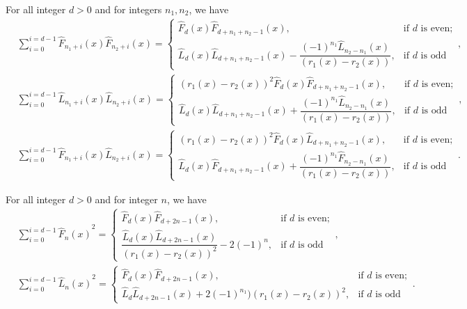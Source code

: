 \begin{theorem}
For all integer $d > 0$ and for integers $n_1, n_2$, we have
\begin{align*}
&\sum_{i=0}^{i=d-1}\widehat{F}_{n_1+i}(x) \widehat{F}_{n_2+i}(x)      =
 \begin{cases}
  \widehat{F}_{d}(x) \widehat{F}_{d+n_1+n_2-1}(x), & \text {if $d$ is even};\\
 \widehat{L}_{d}(x)\widehat{L}_{d+n_1+n_2-1}(x)-\dfrac{(-1)^{n_1}\widehat{L}_{n_2-n_1}(x)}{(r_1(x) - r_2(x))}, & \text{if $d$ is odd}
 \end{cases}, \\
&\sum_{i=0}^{i=d-1}\widehat{L}_{n_1+i}(x)\widehat{L}_{n_2+i}(x) =
 \begin{cases}
(r_1(x) - r_2(x))^2  \widehat{F}_{d}(x) \widehat{F}_{d+n_1+n_2-1}(x), & \text {if $d$ is even};\\
 \widehat{L}_{d}(x)\widehat{L}_{d+n_1+n_2-1}(x)+\dfrac{(-1)^{n_1}\widehat{L}_{n_2-n_1}(x)}{(r_1(x) - r_2(x))}, & \text{if $d$ is odd}
 \end{cases},\\
 &\sum_{i=0}^{i=d-1} \widehat{F}_{n_1+i}(x) \widehat{L}_{n_2+i}(x) =
 \begin{cases}
 (r_1(x) - r_2(x))^2  \widehat{F}_{d}(x) \widehat{L}_{d+n_1+n_2-1}(x), & \text {if $d$ is even};\\
  \widehat{L}_{d}(x)\widehat{F}_{d+n_1+n_2-1}(x)+\dfrac{(-1)^{n_1}\widehat{F}_{n_2-n_1}(x)}{(r_1(x) - r_2(x))}, & \text{if $d$ is odd}
 \end{cases}.
 \end{align*}
\end{theorem}
\begin{corollary} For all integer $d > 0$ and for integer $n$, we have
\begin{align*}
&\sum_{i=0}^{i=d-1}{\widehat{F}_{n}(x)}^2 = 
 \begin{cases}
 \widehat{F}_{d}(x)\widehat{F}_{d+2n-1}(x), & \text {if $d$ is even};\\
 \dfrac{\widehat{L}_{d}(x)\widehat{L}_{d+2n-1}(x)}{(r_1(x) - r_2(x))^2}-2(-1)^{n}, & \text{if $d$ is odd}
 \end{cases},\\
&\sum_{i=0}^{i=d-1}{\widehat{L}_{n}(x)}^2 = 
 \begin{cases}
 \widehat{F}_{d}(x)\widehat{F}_{d+2n-1}(x), & \text {if $d$ is even};\\
 \widehat{L}_{d}\widehat{L}_{d+2n-1}(x)+2(-1)^{n_1})(r_1(x) - r_2(x))^2, & \text{if $d$ is odd}
 \end{cases}.
 \end{align*}
\end{corollary}
